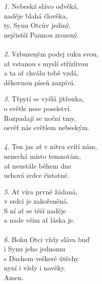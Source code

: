 \begin{translatioMulticol}{3}
{\color{red}\textit{1.}} Nebeská slávo odvěká,\\
naděje blahá člověka,\\
ty, Synu Otcův jediný,\\
nejčistší Pannou zrozený.\\
\\
{\color{red}\textit{2.}} Vzbuzeným podej ruku svou,\\
ať vstanou s myslí střízlivou\\
a ta ať chválu tobě vzdá,\\
děkovnou píseň zazpívá.\columnbreak

{\color{red}\textit{3.}} Třpytí se vyšlá jitřenka,\\
o světle nese poselství.\\
Rozpadají se noční tmy,\\
osvěť nás světlem nebeským.\\
\\
{\color{red}\textit{4.}} Ten jas ať v nitru svítí nám,\\
nenechá místo temnotám,\\
ať neustále během dne\\
uchová srdce čistotné.\columnbreak

{\color{red}\textit{5.}} Ať víra prvně žádaná,\\
v srdci je zakořeněná.\\
S ní ať se těší naděje\\
a nade vším ať láska je.\\
\\
{\color{red}\textit{6.}} Bohu Otci vždy sláva buď\\
i Synu jeho jednomu\\
s Duchem veškeré útěchy\\
nyní i vždy i navěky.\\
Amen.
\end{translatioMulticol}
